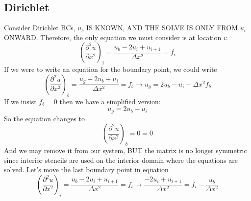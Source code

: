 \documentclass[landscape]{article}
\begin{document}
\subsection{Dirichlet}
Consider Dirichlet BCs, $u_b$ IS KNOWN, AND THE SOLVE IS ONLY FROM $u_i$ ONWARD. Therefore, the only equation we must consider is at location $i$:
\begin{equation}
   \left(\frac{\partial^2 u}{\partial x^2}\right)_{i} =
   \frac{u_b - 2 u_i + u_{i+1}}{\Delta x^2} = f_i
\end{equation}
If we were to write an equation for the boundary point, we could write
\begin{equation}
   \left(\frac{\partial^2 u}{\partial x^2}\right)_{b} =
   \frac{u_g - 2 u_b + u_{i}}{\Delta x^2} = f_b
   \rightarrow
   u_g  = 2 u_b - u_{i} - \Delta x^2 f_b
\end{equation}
If we insist $f_b=0$ then we have a simplified version:
\begin{equation}
   u_g  = 2 u_b - u_{i}
\end{equation}
So the equation changes to
\begin{equation}
   \left(\frac{\partial^2 u}{\partial x^2}\right)_{b} =
   0 = 0
\end{equation}
And we may remove it from our system, BUT the matrix is no longer symmetric since interior stencils are used on the interior domain where the equations are solved. Let's move the last boundary point in equation
\begin{equation}
   \left(\frac{\partial^2 u}{\partial x^2}\right)_{i} =
   \frac{u_b - 2 u_i + u_{i+1}}{\Delta x^2} = f_i
   \rightarrow
   \frac{- 2 u_i + u_{i+1}}{\Delta x^2} = f_i - \frac{u_b}{\Delta x^2}
\end{equation}
\end{document}
